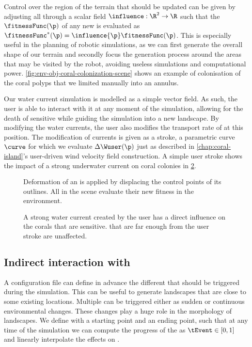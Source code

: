 Control over the region of the terrain that should be updated can be given by adjusting all  through a scalar field $\influence: \R^2 \to \R $ such that the  $\fitnessFunc(\p)$ of any new  is evaluated as $\fitnessFunc^*(\p) = \influence{\p} \fitnessFunc(\p)$. This is especially useful in the planning of robotic simulations, as we can first generate the overall shape of our terrain and secondly focus the generation process around the areas that may be visited by the robot, avoiding useless simulations and computational power.
\cref{fig:env-obj-coral-colonization-scene} shows an example of colonisation of the coral polyps that we limited manually into an annulus.

Our water current simulation is modelled as a simple vector field. As such, the user is able to interact with it at any moment of the simulation, allowing for the death of sensitive  while guiding the simulation into a new landscape. By modifying the water currents, the user also modifies the transport rate of  at this position. The modification of currents is given as a stroke, a parametric curve $\curve$ for which we evaluate $\Delta \Wuser(\p)$ just as described in \cref{chap:coral-island}'s user-driven wind velocity field construction. A simple user stroke shows the impact of a strong underwater current on coral colonies in \cref{fig:env-obj-user-flow-effects}.

\begin{figure}
    \caption{Deformation of an  is applied by displacing the control points of its outlines. All  in the scene evaluate their new fitness in the environment.}
    \label{fig:env-obj-island-deformation}
\end{figure}

\begin{figure}
    \caption{A strong water current created by the user has a direct influence on the corals that are sensitive.  that are far enough from the user stroke are unaffected.}
    \label{fig:env-obj-user-flow-effects}
\end{figure}

\subsection{Indirect interaction with }
\label{sec:env-obj-events}
A configuration file can define in advance the different  that should be triggered during the simulation. This can be useful to generate landscapes that are close to some existing locations.
Multiple  can be triggered either as sudden or continuous environmental changes. These changes play a huge role in the morphology of landscapes.
We define  with a starting point and an ending point, such that at any time of the simulation we can compute the progress of the  as $\tEvent \in [0, 1]$ and linearly interpolate the effects on .

